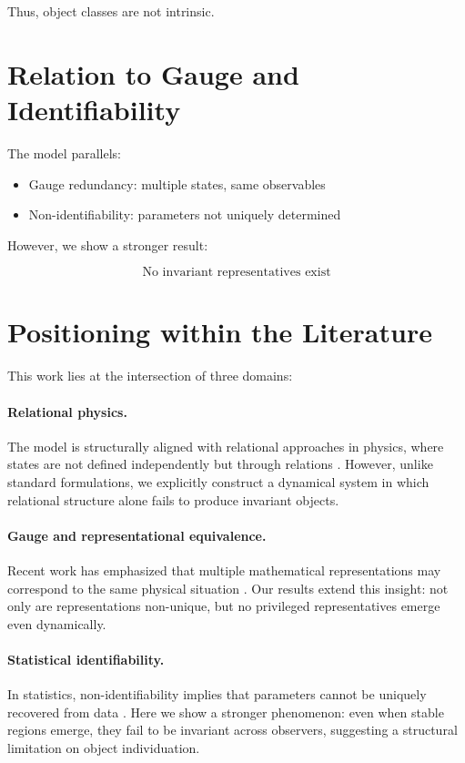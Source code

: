 \documentclass[11pt]{article}
\begin{document}
Thus, object classes are not intrinsic.

\section{Relation to Gauge and Identifiability}

The model parallels:

\begin{itemize}
    \item Gauge redundancy: multiple states, same observables
    \item Non-identifiability: parameters not uniquely determined
\end{itemize}

However, we show a stronger result:

\begin{equation}
\text{No invariant representatives exist}
\end{equation}

\section{Positioning within the Literature}

This work lies at the intersection of three domains:

\paragraph{Relational physics.}
The model is structurally aligned with relational approaches in physics, 
where states are not defined independently but through relations \cite{rovelli_relational}. 
However, unlike standard formulations, we explicitly construct a dynamical system 
in which relational structure alone fails to produce invariant objects.

\paragraph{Gauge and representational equivalence.}
Recent work has emphasized that multiple mathematical representations 
may correspond to the same physical situation \cite{weatherall}. 
Our results extend this insight: not only are representations non-unique, 
but no privileged representatives emerge even dynamically.

\paragraph{Statistical identifiability.}
In statistics, non-identifiability implies that parameters cannot be uniquely recovered from data \cite{stat_inference}. 
Here we show a stronger phenomenon: even when stable regions emerge, 
they fail to be invariant across observers, suggesting a structural limitation 
on object individuation.
\end{document}
